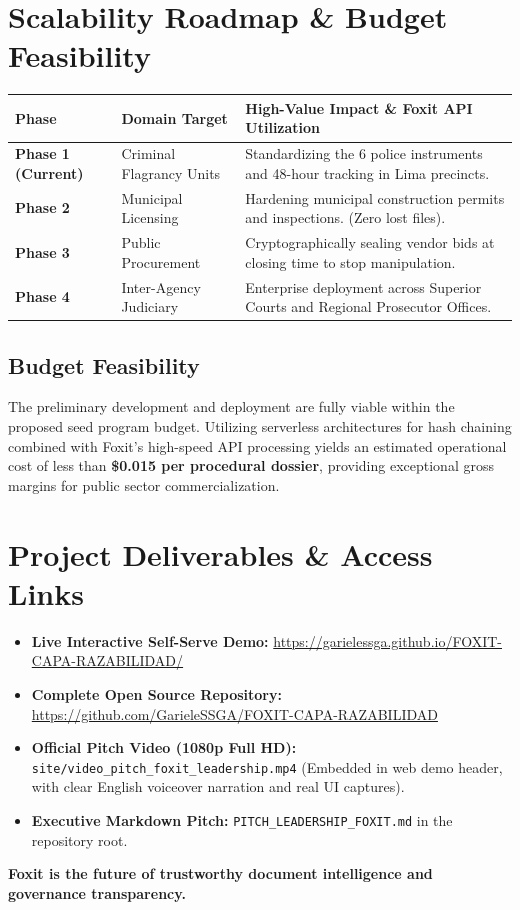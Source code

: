 \documentclass[11pt,a4paper]{article}
\begin{document}
\section{Scalability Roadmap \& Budget Feasibility}

\begin{tabularx}{\textwidth}{@{}l >{\raggedright\arraybackslash}p{3.8cm} >{\raggedright\arraybackslash}X@{}}
\toprule
\textbf{Phase} & \textbf{Domain Target} & \textbf{High-Value Impact \& Foxit API Utilization} \\
\midrule
\textbf{Phase 1 (Current)} & Criminal Flagrancy Units & Standardizing the 6 police instruments and 48-hour tracking in Lima precincts. \\
\addlinespace[2pt]
\textbf{Phase 2} & Municipal Licensing & Hardening municipal construction permits and inspections. (Zero lost files). \\
\addlinespace[2pt]
\textbf{Phase 3} & Public Procurement & Cryptographically sealing vendor bids at closing time to stop manipulation. \\
\addlinespace[2pt]
\textbf{Phase 4} & Inter-Agency Judiciary & Enterprise deployment across Superior Courts and Regional Prosecutor Offices. \\
\bottomrule
\end{tabularx}

\subsection{Budget Feasibility}
The preliminary development and deployment are fully viable within the proposed seed program budget. Utilizing serverless architectures for hash chaining combined with Foxit's high-speed API processing yields an estimated operational cost of less than \textbf{\$0.015 per procedural dossier}, providing exceptional gross margins for public sector commercialization.

\section{Project Deliverables \& Access Links}
\begin{itemize}[leftmargin=1.5em,itemsep=1.5pt,topsep=1pt,parsep=0pt]
    \item \textbf{Live Interactive Self-Serve Demo:} \href{https://garielessga.github.io/FOXIT-CAPA-RAZABILIDAD/}{\color{FoxitOrange}\url{https://garielessga.github.io/FOXIT-CAPA-RAZABILIDAD/}}
    \item \textbf{Complete Open Source Repository:} \href{https://github.com/GarieleSSGA/FOXIT-CAPA-RAZABILIDAD}{\color{FoxitOrange}\url{https://github.com/GarieleSSGA/FOXIT-CAPA-RAZABILIDAD}}
    \item \textbf{Official Pitch Video (1080p Full HD):} \texttt{site/video\_pitch\_foxit\_leadership.mp4} (Embedded in web demo header, with clear English voiceover narration and real UI captures).
    \item \textbf{Executive Markdown Pitch:} \texttt{PITCH\_LEADERSHIP\_FOXIT.md} in the repository root.
\end{itemize}

\vspace{5pt}
\begin{center}
\small \textbf{\color{FoxitOrange}Foxit is the future of trustworthy document intelligence and governance transparency.}
\end{center}
\end{document}
